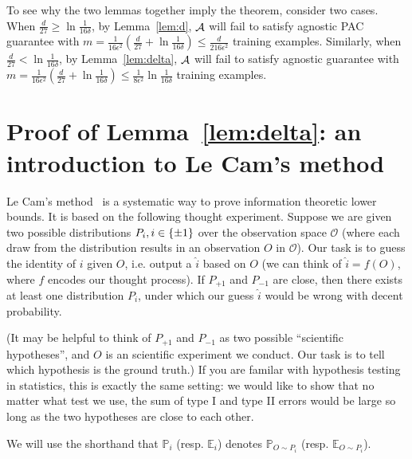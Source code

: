 \documentclass{article}
\DeclareMathOperator*{\Acal}{{\cal A}}
\newcommand{\EE}{\mathbb{E}}
\newcommand{\PP}{\mathbb{P}}
\newcommand{\Ocal}{\mathcal{O}}
\begin{document}
To see why the two lemmas together imply the theorem, consider two cases. When
$\frac{d}{27} \geq \ln\frac1{16\delta}$, by Lemma~\ref{lem:d}, $\Acal$ will fail to satisfy
agnostic PAC guarantee with
$m = \frac{1}{16\epsilon^2}(\frac{d}{27} + \ln\frac1{16\delta}) \leq \frac{d}{216\epsilon^2}$ training examples. Similarly, when $\frac{d}{27} < \ln\frac1{16\delta}$, by Lemma~\ref{lem:delta}, $\Acal$ will fail to satisfy
agnostic guarantee with $m = \frac{1}{16\epsilon^2}(\frac{d}{27} + \ln\frac1{16\delta}) \leq \frac{1}{8\epsilon^2}\ln\frac1{16\delta}$ training examples.

\section{Proof of Lemma~\ref{lem:delta}: an introduction to Le Cam's method}
Le Cam's method~\cite{yu1997assouad} is a systematic way to prove information theoretic
lower bounds. It is based on the following thought experiment. Suppose we are given two possible distributions $P_i, i \in \cbr{\pm 1}$ over the observation space $\Ocal$ (where each draw from the distribution results in an observation $O$ in $\Ocal$).
Our task is to guess the identity of $i$ given $O$, i.e. output a $\hat{i}$ based on $O$ (we can think of $\hat{i} = f(O)$, where $f$ encodes our thought process). If $P_{+1}$ and $P_{-1}$ are close, then there exists at least one distribution $P_i$, under which our guess $\hat{i}$ would be wrong with decent probability.

(It may be helpful to think of $P_{+1}$ and $P_{-1}$ as two possible ``scientific hypotheses'', and $O$ is an scientific experiment we conduct. Our task is to tell which hypothesis is the ground truth.) If you are familar with hypothesis testing in statistics, this is exactly the same setting: we would like to show that no matter what test we use, the sum of type I and type II errors would be large so long as the two hypotheses are close to each other.


We will use the shorthand that $\PP_i$ (resp. $\EE_i$) denotes $\PP_{O \sim P_i}$ (resp. $\EE_{O \sim P_i}$).
\end{document}
